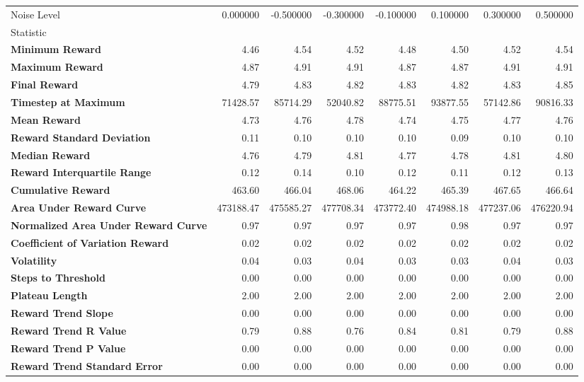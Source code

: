 \begin{tabular}{lrrrrrrr}
\toprule
Noise Level & 0.000000 & -0.500000 & -0.300000 & -0.100000 & 0.100000 & 0.300000 & 0.500000 \\
Statistic &  &  &  &  &  &  &  \\
\midrule
\textbf{Minimum Reward} & 4.46 & 4.54 & 4.52 & 4.48 & 4.50 & 4.52 & 4.54 \\
\textbf{Maximum Reward} & 4.87 & 4.91 & 4.91 & 4.87 & 4.87 & 4.91 & 4.91 \\
\textbf{Final Reward} & 4.79 & 4.83 & 4.82 & 4.83 & 4.82 & 4.83 & 4.85 \\
\textbf{Timestep at Maximum} & 71428.57 & 85714.29 & 52040.82 & 88775.51 & 93877.55 & 57142.86 & 90816.33 \\
\textbf{Mean Reward} & 4.73 & 4.76 & 4.78 & 4.74 & 4.75 & 4.77 & 4.76 \\
\textbf{Reward Standard Deviation} & 0.11 & 0.10 & 0.10 & 0.10 & 0.09 & 0.10 & 0.10 \\
\textbf{Median Reward} & 4.76 & 4.79 & 4.81 & 4.77 & 4.78 & 4.81 & 4.80 \\
\textbf{Reward Interquartile Range} & 0.12 & 0.14 & 0.10 & 0.12 & 0.11 & 0.12 & 0.13 \\
\textbf{Cumulative Reward} & 463.60 & 466.04 & 468.06 & 464.22 & 465.39 & 467.65 & 466.64 \\
\textbf{Area Under Reward Curve} & 473188.47 & 475585.27 & 477708.34 & 473772.40 & 474988.18 & 477237.06 & 476220.94 \\
\textbf{Normalized Area Under Reward Curve} & 0.97 & 0.97 & 0.97 & 0.97 & 0.98 & 0.97 & 0.97 \\
\textbf{Coefficient of Variation Reward} & 0.02 & 0.02 & 0.02 & 0.02 & 0.02 & 0.02 & 0.02 \\
\textbf{Volatility} & 0.04 & 0.03 & 0.04 & 0.03 & 0.03 & 0.04 & 0.03 \\
\textbf{Steps to Threshold} & 0.00 & 0.00 & 0.00 & 0.00 & 0.00 & 0.00 & 0.00 \\
\textbf{Plateau Length} & 2.00 & 2.00 & 2.00 & 2.00 & 2.00 & 2.00 & 2.00 \\
\textbf{Reward Trend Slope} & 0.00 & 0.00 & 0.00 & 0.00 & 0.00 & 0.00 & 0.00 \\
\textbf{Reward Trend R Value} & 0.79 & 0.88 & 0.76 & 0.84 & 0.81 & 0.79 & 0.88 \\
\textbf{Reward Trend P Value} & 0.00 & 0.00 & 0.00 & 0.00 & 0.00 & 0.00 & 0.00 \\
\textbf{Reward Trend Standard Error} & 0.00 & 0.00 & 0.00 & 0.00 & 0.00 & 0.00 & 0.00 \\

\end{tabular}
